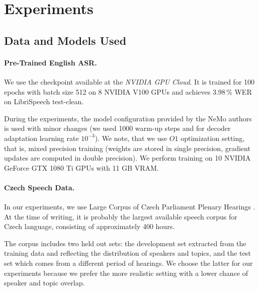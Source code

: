 \section{Experiments}
\label{sec:experiments}


\subsection{Data and Models Used}


\paragraph{Pre-Trained English ASR.}

We use the  checkpoint available at the \textit{NVIDIA GPU Cloud}. It is trained for 100 epochs with batch size 512 on 8 NVIDIA V100 GPUs and achieves 3.98\,\% WER on LibriSpeech  test-clean.

During the experiments, the model configuration provided by the NeMo authors is used with minor changes (we used 1000 warm-up steps and for decoder adaptation learning rate $10^{-3}$). We note, that we use $O1$ optimization setting, that is, mixed precision training (weights are stored in single precision, gradient updates are computed in double precision). We perform training on 10 NVIDIA GeForce GTX 1080 Ti GPUs with 11 GB VRAM.


\paragraph{Czech Speech Data.}
In our experiments, we use Large Corpus of Czech Parliament Plenary Hearings . At the time of writing, it is probably the largest available speech corpus for Czech language, consisting of approximately 400 hours.

The corpus includes two held out sets: the development set extracted from the training data and reflecting the distribution of speakers and topics, and the test set which comes from a different period of hearings. We choose the latter for our experiments because we prefer the more realistic setting with a lower chance of speaker and topic overlap.

